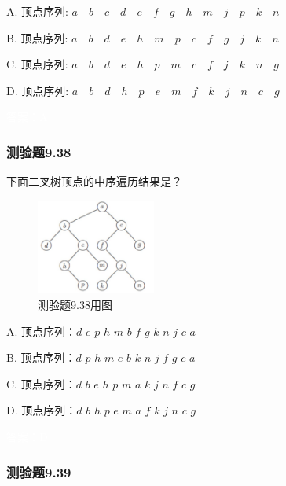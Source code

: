 \documentclass[UTF8, heading=true]{ctexart}
\begin{document}
A. 顶点序列: $a \quad b \quad c \quad d \quad e \quad f \quad g \quad h \quad m \quad j \quad p \quad k \quad n$

B. 顶点序列: $a \quad b \quad d \quad e \quad h \quad m \quad p \quad c \quad f \quad g \quad j \quad k \quad n$

C. 顶点序列: $a \quad b \quad d \quad e \quad h \quad p \quad m \quad c \quad f \quad j \quad k \quad n \quad g$

D. 顶点序列: $a \quad b \quad d \quad h \quad p \quad e \quad m \quad f \quad k \quad j \quad n \quad c \quad g$

\textcolor{white}{答案：A}


\subsubsection{测验题9.38}

下面二叉树顶点的中序遍历结果是？

\begin{figure}[H]
  \centering
  \includegraphics[width=0.35\textwidth]{9.37.jpg} %
  \caption{测验题9.38用图}
\end{figure}

A. 顶点序列：$d$ \quad $e$ \quad $p$ \quad $h$ \quad $m$ \quad $b$ \quad $f$ \quad $g$ \quad $k$ \quad $n$ \quad $j$ \quad $c$ \quad $a$

B. 顶点序列：$d$ \quad $p$ \quad $h$ \quad $m$ \quad $e$ \quad $b$ \quad $k$ \quad $n$ \quad $j$ \quad $f$ \quad $g$ \quad $c$ \quad $a$

C. 顶点序列：$d$ \quad $b$ \quad $e$ \quad $h$ \quad $p$ \quad $m$ \quad $a$ \quad $k$ \quad $j$ \quad $n$ \quad $f$ \quad $c$ \quad $g$

D. 顶点序列：$d$ \quad $b$ \quad $h$ \quad $p$ \quad $e$ \quad $m$ \quad $a$ \quad $f$ \quad $k$ \quad $j$ \quad $n$ \quad $c$ \quad $g$


\textcolor{white}{答案：D}

\subsubsection{测验题9.39}
\end{document}
